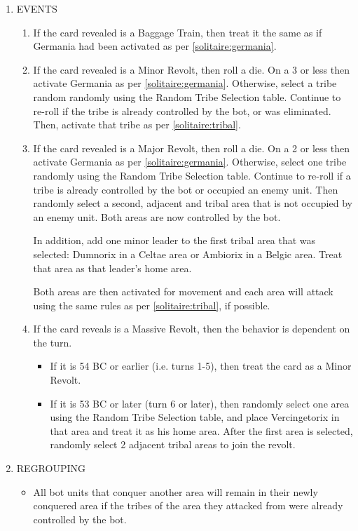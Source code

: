 \begin{enumerate}
  \item EVENTS
  \begin{enumerate}[leftmargin=0in]
    \item If the card revealed is a Baggage Train, then treat it the same as if Germania had been activated as per \ref{solitaire:germania}.
    
    \item If the card revealed is a Minor Revolt, then roll a die. On a 3 or less then activate Germania as per \ref{solitaire:germania}. Otherwise, select a tribe random randomly using the Random Tribe Selection table. Continue to re-roll if the tribe is already controlled by the bot, or was eliminated. Then, activate that tribe as per \ref{solitaire:tribal}.
  
    \item If the card revealed is a Major Revolt, then roll a die. On a 2 or less then activate Germania as per \ref{solitaire:germania}. Otherwise, select one tribe randomly using the Random Tribe Selection table. Continue to re-roll if a tribe is already controlled by the bot or occupied an enemy unit. Then randomly select a second, adjacent and tribal area that is not occupied by an enemy unit. Both areas are now controlled by the bot.
  
    In addition, add one minor leader to the first tribal area that was selected: Dumnorix in a Celtae area or Ambiorix in a Belgic area. Treat that area as that leader's home area.
  
    Both areas are then activated for movement and each area will attack using the same rules as per \ref{solitaire:tribal}, if possible.
  
    \item If the card reveals is a Massive Revolt, then the behavior is dependent on the turn.
    \begin{itemize}
      \item If it is 54 BC or earlier (i.e. turns 1-5), then treat the card as a Minor Revolt.
      \item If it is 53 BC or later (turn 6 or later), then randomly select one area using the Random Tribe Selection table, and place Vercingetorix in that area and treat it as his home area. After the first area is selected, randomly select 2 adjacent tribal areas to join the revolt.
    \end{itemize}
  \end{enumerate}
  
  \item REGROUPING
  \begin{itemize}
    \item All bot units that conquer another area will remain in their newly conquered area if the tribes of the area they attacked from were already controlled by the bot.
    

\end{itemize}
\end{enumerate}
